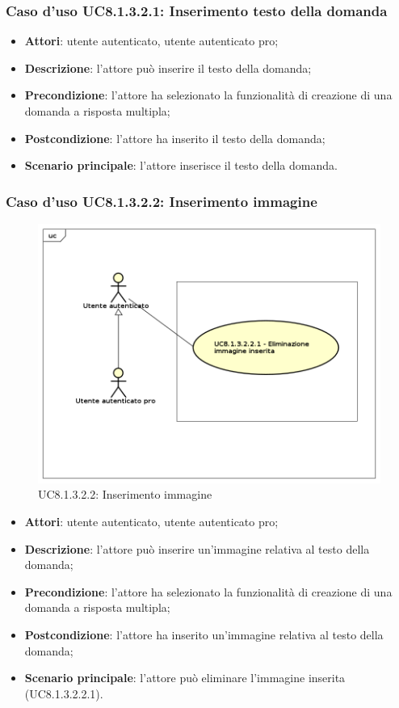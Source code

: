 \subsubsection{Caso d'uso UC8.1.3.2.1: Inserimento testo della domanda}
	\begin{itemize}
		\item
			\textbf{Attori}: utente autenticato, utente autenticato pro;
		\item		
			\textbf{Descrizione}: l'attore può inserire il testo della domanda;
		\item
			\textbf{Precondizione}: l'attore ha selezionato la funzionalità di creazione di una domanda a risposta multipla; 
		\item
			\textbf{Postcondizione}: l'attore ha inserito il testo della domanda;
		\item
			\textbf{Scenario principale}: l'attore inserisce il testo della domanda. 
	 			
	\end{itemize}
	
\subsubsection{Caso d'uso UC8.1.3.2.2: Inserimento immagine}
	\label{UC8.1.3.2.2}
	\begin{figure}[h]
		\centering
			\includegraphics[scale=0.45,keepaspectratio]{UML/UC8_1_3_2_2.png}
		\caption{UC8.1.3.2.2: Inserimento immagine}
	\end{figure}
	\FloatBarrier
	\begin{itemize}
		\item
			\textbf{Attori}: utente autenticato, utente autenticato pro;
		\item		
			\textbf{Descrizione}: l'attore può inserire un'immagine relativa al testo della domanda;
		\item
			\textbf{Precondizione}: l'attore ha selezionato la funzionalità di creazione di una domanda a risposta multipla; 
		\item
			\textbf{Postcondizione}: l'attore ha inserito un'immagine relativa al testo della domanda;
		\item
			\textbf{Scenario principale}: l'attore può eliminare l'immagine inserita (UC8.1.3.2.2.1).						
	\end{itemize}

